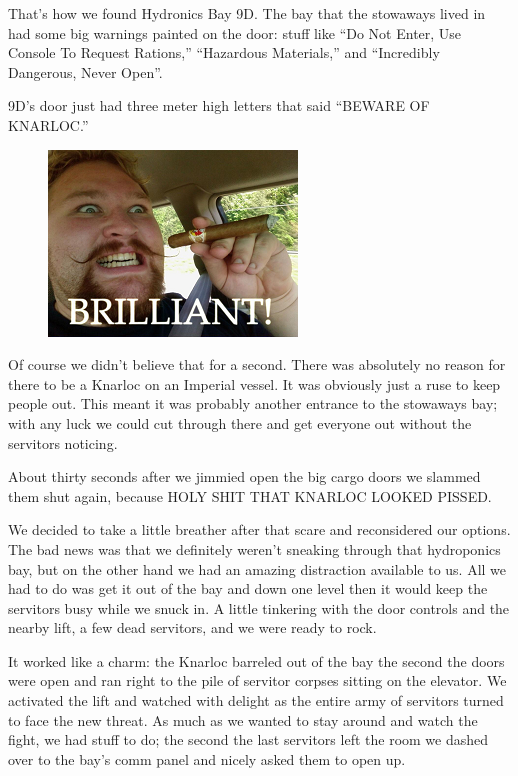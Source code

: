 That’s how we found Hydronics Bay 9D. 
The bay that the stowaways lived in had some big warnings painted on the door: 
stuff like “Do Not Enter, Use Console To Request Rations,” “Hazardous Materials,” and “Incredibly Dangerous, Never Open”. 

9D’s door just had three meter high letters that said “BEWARE OF KNARLOC.”

\begin{figure}
	\begin{center}
		\includegraphics[width=\figwidth]{pics/7/30.png}
	\end{center}
\end{figure}
Of course we didn’t believe that for a second. 
There was absolutely no reason for there to be a Knarloc on an Imperial vessel. 
It was obviously just a ruse to keep people out. 
This meant it was probably another entrance to the stowaways bay; 
with any luck we could cut through there and get everyone out without the servitors noticing.

About thirty seconds after we jimmied open the big cargo doors we slammed them shut again, because HOLY SHIT THAT KNARLOC LOOKED PISSED.

We decided to take a little breather after that scare and reconsidered our options. 
The bad news was that we definitely weren’t sneaking through that hydroponics bay, but on the other hand we had an amazing distraction available to us. 
All we had to do was get it out of the bay and down one level then it would keep the servitors busy while we snuck in. 
A little tinkering with the door controls and the nearby lift, a few dead servitors, and we were ready to rock.

It worked like a charm: 
the Knarloc barreled out of the bay the second the doors were open and ran right to the pile of servitor corpses sitting on the elevator. 
We activated the lift and watched with delight as the entire army of servitors turned to face the new threat. 
As much as we wanted to stay around and watch the fight, we had stuff to do; 
the second the last servitors left the room we dashed over to the bay’s comm panel and nicely asked them to open up.

